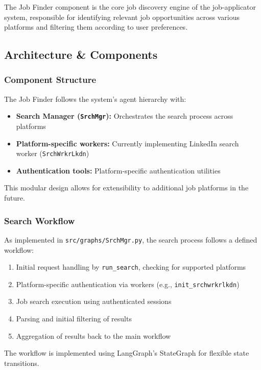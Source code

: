 \documentclass[a4paper,12pt]{article}
\begin{document}
The Job Finder component is the core job discovery engine of the job-applicator system, responsible for identifying relevant job opportunities across various platforms and filtering them according to user preferences.

\subsection{Architecture \& Components}

\subsubsection{Component Structure}
The Job Finder follows the system's agent hierarchy with:

\begin{itemize}
    \item \textbf{Search Manager (\texttt{SrchMgr}):} Orchestrates the search process across platforms
    \item \textbf{Platform-specific workers:} Currently implementing LinkedIn search worker (\texttt{SrchWrkrLkdn})
    \item \textbf{Authentication tools:} Platform-specific authentication utilities
\end{itemize}

This modular design allows for extensibility to additional job platforms in the future.

\subsubsection{Search Workflow}
As implemented in \texttt{src/graphs/SrchMgr.py}, the search process follows a defined workflow:

\begin{enumerate}
    \item Initial request handling by \texttt{run\_search}, checking for supported platforms
    \item Platform-specific authentication via workers (e.g., \texttt{init\_srchwrkrlkdn})
    \item Job search execution using authenticated sessions
    \item Parsing and initial filtering of results
    \item Aggregation of results back to the main workflow
\end{enumerate}

The workflow is implemented using LangGraph's StateGraph for flexible state transitions.
\end{document}

